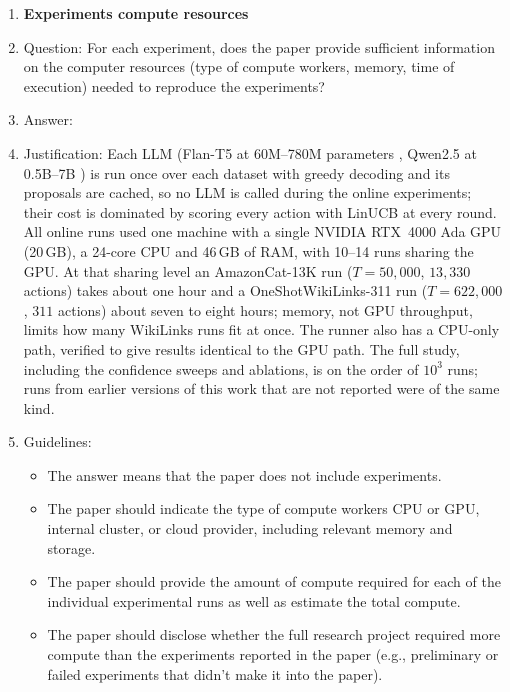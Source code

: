 \documentclass{article}
\theoremstyle{definition}
\theoremstyle{remark}
\theoremstyle{remark}
\begin{document}
\begin{enumerate}
\item {\bf Experiments compute resources}
    \item[] Question: For each experiment, does the paper provide sufficient information on the computer resources (type of compute workers, memory, time of execution) needed to reproduce the experiments?
    \item[] Answer: \answerYes{} %
    \item[] Justification: Each LLM (Flan-T5 at 60M--780M parameters \cite{chung2024scaling}, Qwen2.5 at 0.5B--7B \cite{hui2024qwen2}) is run once over each dataset with greedy decoding and its proposals are cached, so no LLM is called during the online experiments; their cost is dominated by scoring every action with LinUCB at every round. All online runs used one machine with a single NVIDIA RTX~4000 Ada GPU (20\,GB), a 24-core CPU and 46\,GB of RAM, with 10--14 runs sharing the GPU. At that sharing level an AmazonCat-13K run ($T=50{,}000$, $13{,}330$ actions) takes about one hour and a OneShotWikiLinks-311 run ($T=622{,}000$, $311$ actions) about seven to eight hours; memory, not GPU throughput, limits how many WikiLinks runs fit at once. The runner also has a CPU-only path, verified to give results identical to the GPU path. The full study, including the confidence sweeps and ablations, is on the order of $10^3$ runs; runs from earlier versions of this work that are not reported were of the same kind.
    \item[] Guidelines:
    \begin{itemize}
        \item The answer \answerNA{} means that the paper does not include experiments.
        \item The paper should indicate the type of compute workers CPU or GPU, internal cluster, or cloud provider, including relevant memory and storage.
        \item The paper should provide the amount of compute required for each of the individual experimental runs as well as estimate the total compute. 
        \item The paper should disclose whether the full research project required more compute than the experiments reported in the paper (e.g., preliminary or failed experiments that didn't make it into the paper). 
    \end{itemize}
    

\end{enumerate}
\end{document}
